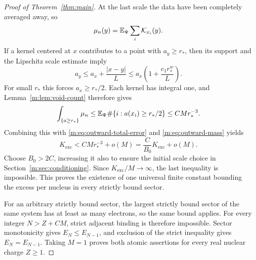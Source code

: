 \begin{proof}[Proof of Theorem~\ref{thm:main}]
At the last scale the data have been completely averaged away, so
\[
 \mu_n(y)=\mathbb E_\Psi\sum_i\mathcal K_{x_i}(y).
\]
If a kernel centered at $x$ contributes to a point with $a_y\ge r_*$,
then its support and the Lipschitz scale estimate imply
\[
 a_y\le a_x+\frac{|x-y|}{L}
       \le a_x\left(1+\frac{c_1r_*^w}{L}\right).
\]
For small $r_*$ this forces $a_x\ge r_*/2$.  Each kernel has integral one,
and Lemma~\ref{m:lem:void-count} therefore gives
\[
 \int_{\{a\ge r_*\}}\mu_n
   \le\mathbb E_\Psi\#\{i:a(x_i)\ge r_*/2\}
   \le C M r_*^{-3}.
\]
Combining this with \eqref{m:eq:outward-total-error} and
\eqref{m:eq:outward-mass} yields
\[
 K_{\mathrm{exc}}<C M r_*^{-3}+o(M)
                  =\frac{C}{B_0}K_{\mathrm{exc}}+o(M).
\]
Choose $B_0>2C$, increasing it also to ensure the initial scale choice in
Section~\ref{m:sec:conditioning}.  Since $K_{\mathrm{exc}}/M\to\infty$, the last
inequality is impossible.  This proves the existence of one universal finite
constant bounding the excess per nucleus in every strictly bound sector.

For an arbitrary strictly bound sector, the largest strictly bound sector of
the same system has at least as many electrons, so the same bound applies.
For every integer $N>Z+CM$, strict adjacent binding is therefore impossible.
Sector monotonicity gives $E_N\le E_{N-1}$, and exclusion of the strict
inequality gives $E_N=E_{N-1}$.  Taking $M=1$ proves both atomic assertions
for every real nuclear charge $Z\ge1$.
\end{proof}
